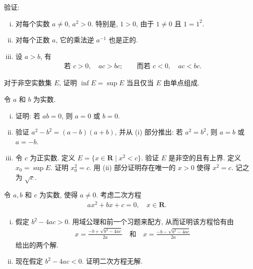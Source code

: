 \documentclass[../../main.tex]{subfiles}
\begin{document}
\begin{exercise}\label{exercise:ch01-02}
验证:
\begin{enumerate}[(i)]
\item 对每个实数 $a\neq 0$, $a^{2}>0$. 特别是, $1>0$, 由于 $1\neq 0$ 且 $1=1^{2}$.
\item 对每个正数 $a$, 它的乘法逆 $a^{-1}$ 也是正的.
\item 设 $a>b$, 有
\begin{align*}
\text{若 }c>0,\quad ac>bc;\qquad\text{而若 }c<0,\quad ac<bc.
\end{align*}
\end{enumerate}
\end{exercise}

\begin{exercise}\label{exercise:ch01-03}
对于非空实数集 $E$, 证明 $\inf E=\sup E$ 当且仅当 $E$ 由单点组成.
\end{exercise}

\begin{exercise}\label{exercise:ch01-04}
令 $a$ 和 $b$ 为实数.
\begin{enumerate}[(i)]
\item 证明: 若 $ab=0$, 则 $a=0$ 或 $b=0$.
\item 验证 $a^{2}-b^{2}=(a-b)(a+b)$, 并从 (i) 部分推出: 若 $a^{2}=b^{2}$, 则 $a=b$ 或 $a=-b$.
\item 令 $c$ 为正实数. 定义 $E=\{x\in\mathbf{R}\mid x^{2}<c\}$. 验证 $E$ 是非空的且有上界. 定义 $x_{0}=\sup E$. 证明 $x_{0}^{2}=c$. 用 (ii) 部分证明存在唯一的 $x>0$ 使得 $x^{2}=c$. 记之为 $\sqrt{c}$.
\end{enumerate}
\end{exercise}

\begin{exercise}\label{exercise:ch01-05}
令 $a,b$ 和 $c$ 为实数, 使得 $a\neq 0$. 考虑二次方程
\begin{align*}
ax^{2}+bx+c=0,\quad x\in\mathbf{R}.
\end{align*}
\begin{enumerate}[(i)]
\item 假定 $b^{2}-4ac>0$. 用域公理和前一个习题来配方, 从而证明该方程恰有由
\begin{align*}
x=\frac{-b+\sqrt{b^{2}-4ac}}{2a}\quad\text{和}\quad x=\frac{-b-\sqrt{b^{2}-4ac}}{2a}
\end{align*}
给出的两个解.
\item 现在假定 $b^{2}-4ac<0$. 证明二次方程无解.
\end{enumerate}
\end{exercise}
\end{document}
